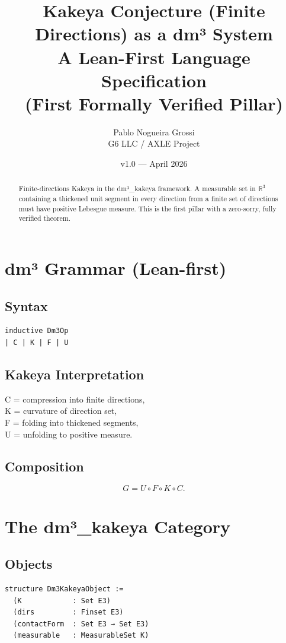 \documentclass[11pt,a4paper]{article}
\title{\textbf{Kakeya Conjecture (Finite Directions) as a dm³ System}\\
A Lean-First Language Specification \\
(First Formally Verified Pillar)}
\author{Pablo Nogueira Grossi \\ G6 LLC / AXLE Project}
\date{v1.0 — April 2026}
\begin{document}
\maketitle

\begin{abstract}
Finite-directions Kakeya in the dm³\_kakeya framework.
A measurable set in \(\mathbb{R}^3\) containing a thickened unit segment in every direction
from a finite set of directions must have positive Lebesgue measure.
This is the first pillar with a zero-sorry, fully verified theorem.
\end{abstract}

\section{dm³ Grammar (Lean-first)}

\subsection{Syntax}
\begin{lstlisting}
inductive Dm3Op
| C | K | F | U
\end{lstlisting}

\subsection{Kakeya Interpretation}
C = compression into finite directions, \\
K = curvature of direction set, \\
F = folding into thickened segments, \\
U = unfolding to positive measure.

\subsection{Composition}
\[
G = U \circ F \circ K \circ C.
\]

\section{The dm³\_kakeya Category}

\subsection{Objects}
\begin{lstlisting}
structure Dm3KakeyaObject :=
  (K            : Set E3)
  (dirs         : Finset E3)
  (contactForm  : Set E3 → Set E3)
  (measurable   : MeasurableSet K)
\end{lstlisting}
\end{document}
